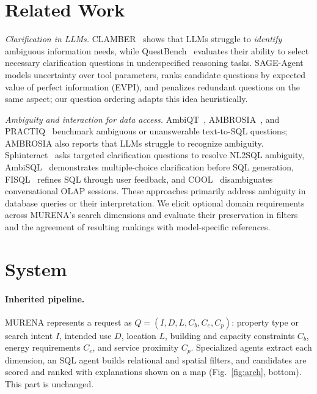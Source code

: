 \documentclass[sigconf,review]{acmart}
\begin{document}
\section{Related Work}
\label{sec:related}
\emph{Clarification in LLMs.} CLAMBER~\cite{zhang2024clamber} shows that LLMs struggle to \emph{identify} ambiguous information needs, while QuestBench~\cite{li2025questbench} evaluates their ability to select necessary clarification questions in underspecified reasoning tasks. SAGE-Agent~\cite{suri2026sage} models uncertainty over tool parameters, ranks candidate questions by expected value of perfect information (EVPI), and penalizes redundant questions on the same aspect; our question ordering adapts this idea heuristically.

\emph{Ambiguity and interaction for data access.}
AmbiQT~\cite{bhaskar2023ambiqt}, AMBROSIA~\cite{saparina2024ambrosia}, and PRACTIQ~\cite{dong2025practiq} benchmark ambiguous or unanswerable text-to-SQL questions; AMBROSIA also reports that LLMs struggle to recognize ambiguity. Sphinteract~\cite{zhao2024sphinteract} asks targeted clarification questions to resolve NL2SQL ambiguity, AmbiSQL~\cite{ding2026ambisql} demonstrates multiple-choice clarification before SQL generation, FISQL~\cite{menon2025fisql} refines SQL through user feedback, and COOL~\cite{francia2021cool} disambiguates conversational OLAP sessions. These approaches primarily address ambiguity in database queries or their interpretation. We elicit optional domain requirements across MURENA’s search dimensions and evaluate their preservation in filters and the agreement of resulting rankings with model-specific references.

\section{System}
\label{sec:system}
\paragraph{Inherited pipeline.} MURENA represents a request as
$Q=(I,D,L,\allowbreak C_b,C_e,C_p)$: property type or search intent $I$, intended
use $D$, location $L$, building and capacity constraints $C_b$, energy
requirements $C_e$, and service proximity $C_p$. Specialized agents
extract each dimension, an SQL agent builds relational and spatial
filters, and candidates are scored and ranked with explanations shown on
a map (Fig.~\ref{fig:arch}, bottom). This part is unchanged.
\end{document}
